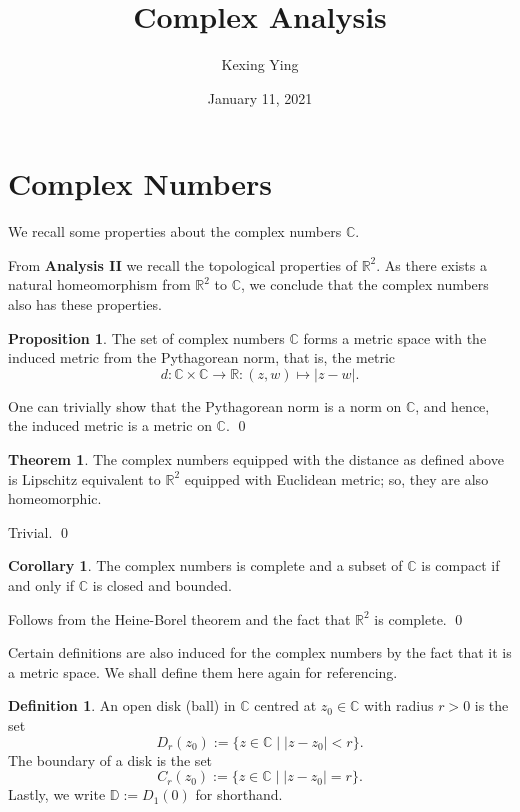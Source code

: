 \documentclass[
]{article}
\title{Complex Analysis}
\author{Kexing Ying}
\date{January 11, 2021}
\theoremstyle{definition}
\newtheorem{theorem}{Theorem}
\newtheorem{prop}{Proposition}
\newtheorem{corollary}{Corollary}[theorem]
\theoremstyle{definition}
\newtheorem{definition}{Definition}[section]
\begin{document}
\maketitle

{
\hypersetup{linkcolor=}
\setcounter{tocdepth}{2}
\tableofcontents
}
\newpage

\hypertarget{complex-numbers}{%
\section{Complex Numbers}\label{complex-numbers}}

We recall some properties about the complex numbers \(\mathbb{C}\).

From \textbf{Analysis II} we recall the topological properties of
\(\mathbb{R}^2\). As there exists a natural homeomorphism from
\(\mathbb{R}^2\) to \(\mathbb{C}\), we conclude that the complex numbers
also has these properties.

\begin{prop}
  The set of complex numbers \(\mathbb{C}\) forms a metric space with the induced 
  metric from the Pythagorean norm, that is, the metric
  \[d : \mathbb{C} \times \mathbb{C} \to \mathbb{R} : (z, w) \mapsto \left| z - w \right|.\]
\end{prop}
\proof

One can trivially show that the Pythagorean norm is a norm on
\(\mathbb{C}\), and hence, the induced metric is a metric on
\(\mathbb{C}\). \qed

\begin{theorem}
  The complex numbers equipped with the distance as defined above is Lipschitz 
  equivalent to \(\mathbb{R}^2\) equipped with Euclidean metric; so, they are 
  also homeomorphic.
\end{theorem}
\proof

Trivial. \qed

\begin{corollary}
  The complex numbers is complete and a subset of \(\mathbb{C}\) is compact if 
  and only if \(\mathbb{C}\) is closed and bounded.
\end{corollary}
\proof

Follows from the Heine-Borel theorem and the fact that \(\mathbb{R}^2\)
is complete. \qed

Certain definitions are also induced for the complex numbers by the fact
that it is a metric space. We shall define them here again for
referencing.

\begin{definition}
  An open disk (ball) in \(\mathbb{C}\) centred at \(z_0 \in \mathbb{C}\) with 
  radius \(r > 0\) is the set 
  \[D_r(z_0) := \{ z \in \mathbb{C} \mid \left| z - z_0 \right| < r\}.\]
  The boundary of a disk is the set 
  \[C_r(z_0) := \{z \in \mathbb{C} \mid \left | z - z_0 \right| = r\}.\]
  Lastly, we write \(\mathbb{D} := D_1(0)\) for shorthand.
\end{definition}
\end{document}
